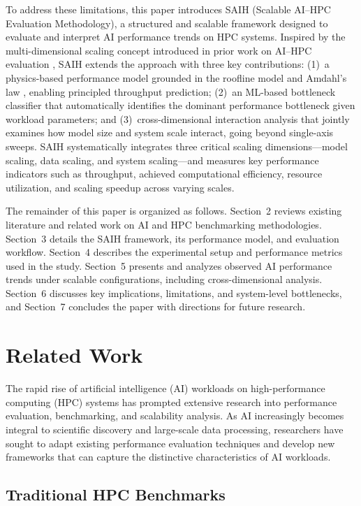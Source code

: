 \documentclass{llncs}
\begin{document}
To address these limitations, this paper introduces SAIH (Scalable AI--HPC Evaluation Methodology), a structured and scalable framework designed to evaluate and interpret AI performance trends on HPC systems. Inspired by the multi-dimensional scaling concept introduced in prior work on AI--HPC evaluation \cite{Wang2024SAIH}, SAIH extends the approach with three key contributions: (1)~a physics-based performance model grounded in the roofline model \cite{Williams2009Roofline} and Amdahl's law \cite{Amdahl1967}, enabling principled throughput prediction; (2)~an ML-based bottleneck classifier that automatically identifies the dominant performance bottleneck given workload parameters; and (3)~cross-dimensional interaction analysis that jointly examines how model size and system scale interact, going beyond single-axis sweeps. SAIH systematically integrates three critical scaling dimensions---model scaling, data scaling, and system scaling---and measures key performance indicators such as throughput, achieved computational efficiency, resource utilization, and scaling speedup across varying scales.

The remainder of this paper is organized as follows. Section~2 reviews existing literature and related work on AI and HPC benchmarking methodologies. Section~3 details the SAIH framework, its performance model, and evaluation workflow. Section~4 describes the experimental setup and performance metrics used in the study. Section~5 presents and analyzes observed AI performance trends under scalable configurations, including cross-dimensional analysis. Section~6 discusses key implications, limitations, and system-level bottlenecks, and Section~7 concludes the paper with directions for future research.

\section{Related Work}

The rapid rise of artificial intelligence (AI) workloads on high-performance computing (HPC) systems has prompted extensive research into performance evaluation, benchmarking, and scalability analysis. As AI increasingly becomes integral to scientific discovery and large-scale data processing, researchers have sought to adapt existing performance evaluation techniques and develop new frameworks that can capture the distinctive characteristics of AI workloads.

\subsection{Traditional HPC Benchmarks}
\end{document}

